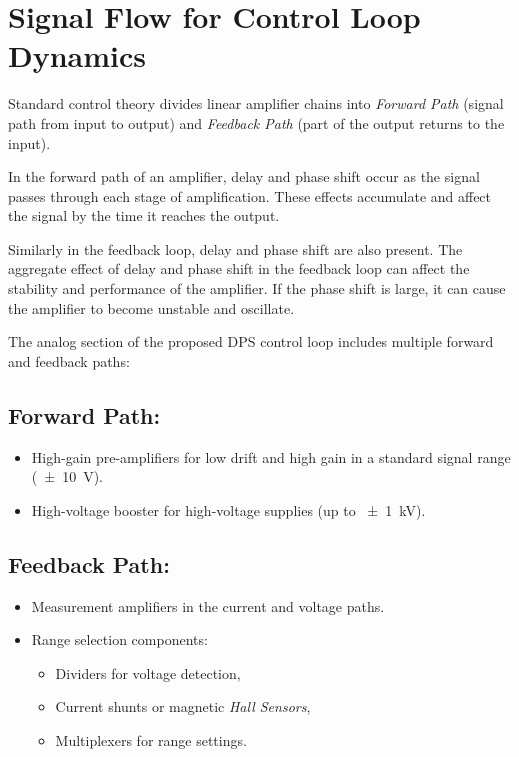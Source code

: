 

\section{Signal Flow for Control Loop Dynamics}
\label{sec:signal-flow-control-loop-dynamics}

Standard control theory divides linear amplifier chains into
\emph{Forward Path} (signal path from input to output) and
\emph{Feedback Path} (part of the output returns to the input).


In the forward path of an amplifier, delay and phase shift occur as the
signal passes through each stage of amplification.
These effects accumulate and affect the signal by the time it
reaches the output.

Similarly in the feedback loop, delay and phase shift are also present.
The aggregate effect of delay and phase shift in the feedback loop can affect
the stability and performance of the amplifier.
If the phase shift is large, it can cause the amplifier to become
unstable and oscillate.

The analog section of the proposed \ac{DPS} control loop includes multiple
forward and feedback paths:

\subsection*{Forward Path:}
\begin{itemize}[topsep=8pt,itemsep=4pt,partopsep=4pt, parsep=4pt]
    \item
    High-gain pre-amplifiers for low drift and high gain in a standard
    signal range (\SI{\pm10}{\volt}).
    \item
    High-voltage booster for high-voltage
    supplies (up to \SI{\pm1}{\kilo\volt}).
\end{itemize}

\subsection*{Feedback Path:}
\begin{itemize}[topsep=8pt,itemsep=4pt,partopsep=4pt, parsep=4pt]
    \item Measurement amplifiers in the current and voltage paths.
    \item Range selection components:
    \begin{itemize}
        \item Dividers for voltage detection,
        \item Current shunts or magnetic \emph{Hall Sensors},
        \item Multiplexers for range settings.
    \end{itemize}

\end{itemize}

